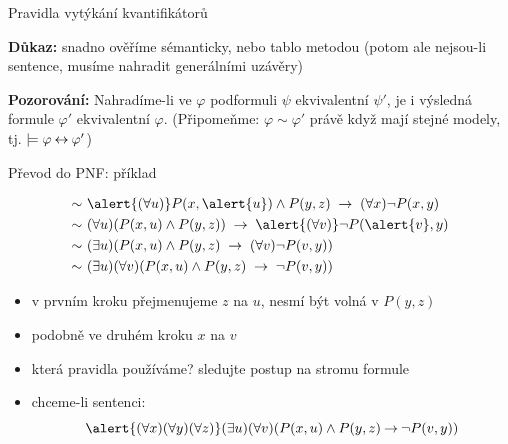 \documentclass{beamer}
\begin{document}
\begin{frame}{Pravidla vytýkání kvantifikátorů}

    \pause

    \pause
    \textbf{Důkaz:} snadno ověříme sémanticky, nebo tablo metodou (potom ale nejsou-li sentence, musíme nahradit generálními uzávěry)\hfill\qedsymbol

    \smallskip

    \pause
    \textbf{Pozorování:} Nahradíme-li ve $\varphi$ podformuli $\psi$ ekvivalentní $\psi'$, je i výsledná formule $\varphi'$ ekvivalentní $\varphi$. (Připomeňme: $\varphi\sim\varphi'$ právě když mají stejné modely, tj. $\models\varphi\mathbin{\leftrightarrow}\varphi'$)
    
\end{frame}


\begin{frame}{Převod do PNF: příklad}

    \pause
    \begin{align*}
        \sim &\ 
        \alert{(\forall u)} P(x,\alert{u})\land P(y,z)\ \limplies\ (\forall x)\neg P(x,y)\\ \sim &\ 
        (\forall u)(P(x,u)\land P(y,z))\ \limplies\ \alert{(\forall v)}\neg P(\alert{v},y)\\ \sim &\ 
        (\exists u)( P(x,u)\land P(y,z)\ \limplies\ (\forall v)\neg P(v,y))\\ \sim &\ 
        (\exists u)(\forall v)( P(x,u)\land P(y,z)\ \limplies\ \neg P(v,y))
    \end{align*}
    
    \pause
    \begin{itemize}[<+->]
        \item v prvním kroku přejmenujeme $z$ na $u$, \alert{nesmí být volná v $P(y,z)$}
        \item podobně ve druhém kroku $x$ na $v$
        \item která pravidla používáme? sledujte postup na stromu formule
        \item chceme-li sentenci:
        $$
        \alert{(\forall x)(\forall y)(\forall z)}(\exists u)(\forall v)( P(x,u)\land P(y,z)\limplies\neg P(v,y))
        $$
    \end{itemize}

\end{frame}
\end{document}
